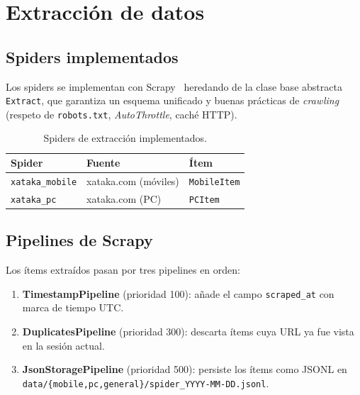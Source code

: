 \documentclass{llncs}
\begin{document}
\section{Extracción de datos}

\subsection{Spiders implementados}

Los spiders se implementan con Scrapy~\cite{scrapy2023} heredando de la clase
base abstracta \texttt{Extract}, que garantiza un esquema unificado y buenas
prácticas de \textit{crawling} (respeto de \texttt{robots.txt},
\textit{AutoThrottle}, caché HTTP).

\begin{table}[h]
  \centering
  \caption{Spiders de extracción implementados.}
  \begin{tabular}{lll}
    \toprule
    \textbf{Spider} & \textbf{Fuente} & \textbf{Ítem} \\
    \midrule
    \texttt{xataka\_mobile}  & xataka.com (móviles) & \texttt{MobileItem} \\
    \texttt{xataka\_pc}      & xataka.com (PC)      & \texttt{PCItem} \\
    \bottomrule
  \end{tabular}
\end{table}

\subsection{Pipelines de Scrapy}

Los ítems extraídos pasan por tres pipelines en orden:

\begin{enumerate}
  \item \textbf{TimestampPipeline} (prioridad 100): añade el campo
    \texttt{scraped\_at} con marca de tiempo UTC.
  \item \textbf{DuplicatesPipeline} (prioridad 300): descarta ítems cuya
    URL ya fue vista en la sesión actual.
  \item \textbf{JsonStoragePipeline} (prioridad 500): persiste los ítems
    como JSONL en \texttt{data/\{mobile,pc,general\}/spider\_YYYY-MM-DD.jsonl}.
\end{enumerate}
\end{document}
